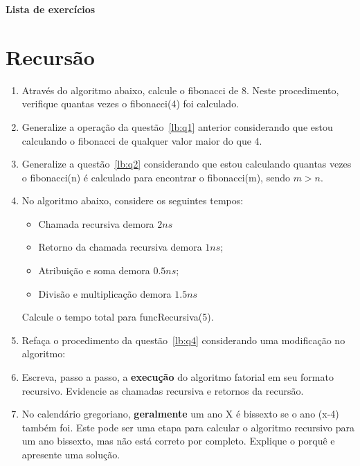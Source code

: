\documentclass[12pt]{article}
\begin{document}
\begin{center}
    \LARGE \textbf{Lista de exercícios}
\end{center}
\section*{Recursão}
\begin{enumerate}[label=\textbf{Q\arabic*}]
    \item Através do algoritmo abaixo, calcule o fibonacci de 8. Neste procedimento, verifique quantas vezes o fibonacci(4) foi calculado.
          \label{lb:q1}

    \item Generalize a operação da questão~\ref{lb:q1} anterior considerando que estou calculando o fibonacci de qualquer valor maior do que 4.\label{lb:q2}

    \item Generalize a questão~\ref{lb:q2} considerando que estou calculando quantas vezes o fibonacci(n) é calculado para encontrar o fibonacci(m), sendo $m>n$.

    \item No algoritmo abaixo, considere os seguintes tempos:
          \begin{itemize}
              \item Chamada recursiva demora $2ns$
              \item Retorno da chamada recursiva demora $1ns$;
              \item Atribuição e soma demora $0.5ns$;
              \item Divisão e multiplicação demora $1.5ns$
          \end{itemize}
          
          Calcule o tempo total para funcRecursiva(5).\label{lb:q4}

    \item Refaça o procedimento da questão~\ref{lb:q4} considerando uma modificação no algoritmo:

    \item Escreva, passo a passo, a \textbf{execução} do algoritmo fatorial em seu formato recursivo. Evidencie as chamadas recursiva e retornos da recursão.

    \item No calendário gregoriano, \textbf{geralmente} um ano X é bissexto se o ano (x-4) também foi. Este pode ser uma etapa para calcular o algoritmo recursivo para um ano bissexto, mas não está correto por completo. Explique o porquê e apresente uma solução.


\end{enumerate}
\end{document}
